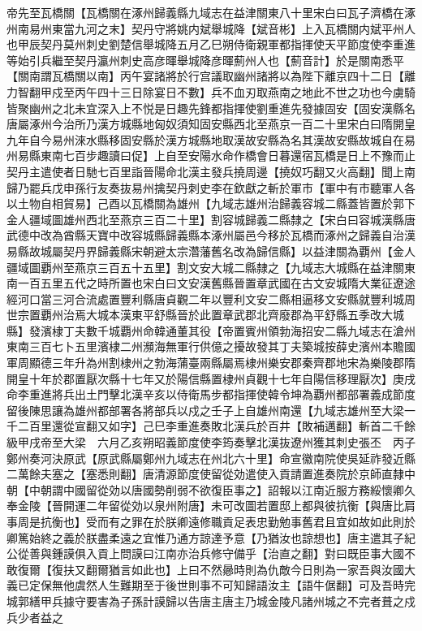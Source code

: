 帝先至瓦橋關【瓦橋關在涿州歸義縣九域志在益津關東八十里宋白曰瓦子濟橋在涿州南易州東當九河之末】契丹守將姚内斌舉城降【斌音彬】上入瓦橋關内斌平州人也甲辰契丹莫州刺史劉楚信舉城降五月乙巳朔侍衛親軍都指揮使天平節度使李重進等始引兵繼至契丹瀛州刺史高彦暉舉城降彦暉薊州人也【薊音計】於是關南悉平【關南謂瓦橋關以南】丙午宴諸將於行宫議取幽州諸將以為陛下離京四十二日【離力智翻甲戍至丙午四十三日除宴日不數】兵不血刃取燕南之地此不世之功也今虜騎皆聚幽州之北未宜深入上不悦是日趣先鋒都指揮使劉重進先發據固安【固安漢縣名唐屬涿州今治所乃漢方城縣地匈奴須知固安縣西北至燕京一百二十里宋白曰隋開皇九年自今易州淶水縣移固安縣於漢方城縣地取漢故安縣為名其漢故安縣故城自在易州易縣東南七百步趣讀曰促】上自至安陽水命作橋會日暮還宿瓦橋是日上不豫而止契丹主遣使者日馳七百里詣晉陽命北漢主發兵撓周邊【撓奴巧翻又火高翻】聞上南歸乃罷兵戊申孫行友奏抜易州擒契丹刺史李在欽獻之斬於軍市【軍中有市聽軍人各以土物自相貿易】己酉以瓦橋關為雄州【九域志雄州治歸義容城二縣蓋皆置於郭下金人疆域圖雄州西北至燕京三百二十里】割容城歸義二縣隸之【宋白曰容城漢縣唐武德中改為酋縣天寶中改容城縣歸義縣本涿州屬邑今移於瓦橋而涿州之歸義自治漢易縣故城屬契丹界歸義縣宋朝避太宗濳藩舊名改為歸信縣】以益津關為覇州【金人疆域圖覇州至燕京三百五十五里】割文安大城二縣隸之【九域志大城縣在益津關東南一百五里五代之時所置也宋白曰文安漢舊縣晉置章武國在古文安城隋大業征遼途經河口當三河合流處置豐利縣唐貞觀二年以豐利文安二縣相逼移文安縣就豐利城周世宗置覇州治焉大城本漢東平舒縣晉於此置章武郡北齊廢郡為平舒縣五季改大城縣】發濱棣丁夫數千城覇州命韓通董其役【帝置賓州領勃海招安二縣九域志在滄州東南三百七卜五里濱棣二州瀕海無軍行供億之擾故發其丁夫築城按薛史濱州本贍國軍周顯德三年升為州割棣州之勃海蒲臺兩縣屬焉棣州樂安郡秦齊郡地宋為樂陵郡隋開皇十年於郡置厭次縣十七年又於陽信縣置棣州貞觀十七年自陽信移理厭次】庚戌命李重進將兵出土門擊北漢辛亥以侍衛馬步都指揮使韓令坤為覇州都部署義成節度留後陳思讓為雄州都部署各將部兵以戍之壬子上自雄州南還【九域志雄州至大梁一千二百里還從宣翻又如字】己巳李重進奏敗北漢兵於百井【敗補邁翻】斬首二千餘級甲戌帝至大梁　六月乙亥朔昭義節度使李筠奏擊北漢抜遼州獲其刺史張丕　丙子鄭州奏河決原武【原武縣屬鄭州九域志在州北六十里】命宣徽南院使吳延祚發近縣二萬餘夫塞之【塞悉則翻】唐清源節度使留從効遣使入貢請置進奏院於京師直隸中朝【中朝謂中國留從効以唐國勢削弱不欲復臣事之】詔報以江南近服方務綏懷卿久奉金陵【晉開運二年留從効以泉州附唐】未可改圖若置邸上都與彼抗衡【與唐比肩事周是抗衡也】受而有之罪在於朕卿遠修職貢足表忠勤勉事舊君且宜如故如此則於卿篤始終之義於朕盡柔遠之宜惟乃通方諒達予意【乃猶汝也諒想也】唐主遣其子紀公從善與鍾謨俱入貢上問謨曰江南亦治兵修守備乎【治直之翻】對曰既臣事大國不敢復爾【復扶又翻爾猶言如此也】上曰不然曏時則為仇敵今日則為一家吾與汝國大義已定保無他虞然人生難期至于後世則事不可知歸語汝主【語牛倨翻】可及吾時完城郭繕甲兵據守要害為子孫計謨歸以告唐主唐主乃城金陵凡諸州城之不完者葺之戍兵少者益之

